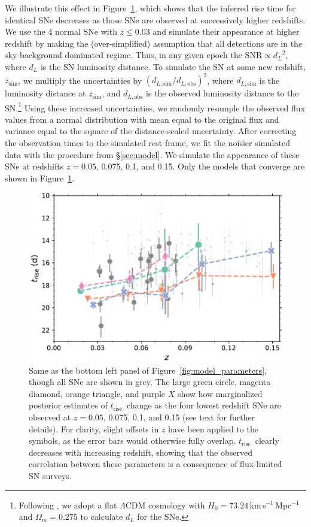 \documentclass[twocolumn]{aastex63}
\newcommand{\trise}{$t_\mathrm{rise}$}
\begin{document}
We illustrate this effect in Figure~\ref{fig:high_z_systematic}, which shows
that the inferred rise time for identical SNe decreases as those SNe are
observed at successively higher redshifts. We use the 4 normal SNe with $z \le
0.03$ and simulate their appearance at higher redshift by making the
(over-simplified) assumption that all detections are in the sky-background
dominated regime. Thus, in any given epoch the $\mathrm{SNR} \propto
d_L^{-2}$, where $d_L$ is the SN luminosity distance. To simulate the SN at
some new redshift, $z_\mathrm{sim}$, we multiply the uncertainties by
$(d_{L,\mathrm{sim}}/d_{L,\mathrm{obs}})^2$, where $d_{L,\mathrm{sim}}$ is the
luminosity distance at $z_\mathrm{sim}$, and $d_{L,\mathrm{obs}}$ is the
observed luminosity distance to the SN.\footnote{Following \citet{Yao19}, we
adopt a flat $\Lambda$CDM cosmology with $H_0 =
73.24$\,km\,s$^{-1}$\,Mpc$^{-1}$ \citep{Riess16} and $\Omega_m = 0.275$
\citep{Amanullah10} to calculate $d_L$ for the SNe.} Using these increased
uncertainties, we randomly resample the observed flux values from a normal
distribution with mean equal to the original flux and variance equal to the
square of the distance-scaled uncertainty. After correcting the observation
times to the simulated rest frame, we fit the noisier simulated data with the
procedure from \S\ref{sec:model}. We simulate the appearance of these SNe at
redshifts $z = 0.05$, 0.075, 0.1, and 0.15. Only the models that converge are
shown in Figure~\ref{fig:high_z_systematic}.

\begin{figure}
    \centering
    \includegraphics[width=1\linewidth]{./figures/high_z_systematic.pdf}
    \caption{Same as the bottom left panel of
    Figure~\ref{fig:model_parameters}, though all SNe are shown in grey. The
    large green circle, magenta diamond, orange triangle, and purple $X$ show
    how marginalized posterior estimates of \trise\ change as the four lowest
    redshift SNe are observed at $z = 0.05$, 0.075, 0.1, and 0.15 (see text
    for further details). For clarity, slight offsets in $z$ have been applied
    to the symbols, as the error bars would otherwise fully overlap. \trise\
    clearly decreases with increasing redshift, showing that the observed
    correlation between these parameters is a consequence of flux-limited SN
    surveys.}
    \label{fig:high_z_systematic}
\end{figure}
\end{document}
